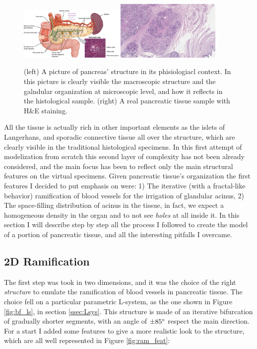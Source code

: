 \documentclass[12pt,a4paper]{report}
\begin{document}
\begin{figure}
    \centering
    \includegraphics[width = 0.45\textwidth]{images/panc_struct}
    \includegraphics[width = 0.45\textwidth]{images/panc_specimen}
    \caption{(left) A picture of pancreas' structure in its phisiologiacl context. In this picture is clearly visible the macroscopic structure and the galndular organization at microscopic level, and how it reflects in the histological sample. (right) A real pancreatic tissue sample with H\&E staining.}
    \label{fig:panc_struct}
\end{figure}

All the tissue is actually rich in other important elements as the islets of Langerhans, and sporadic connective tissue all over the structure, which are clearly visible in the traditional histological specimens. In this first attempt of modelization from scratch this second layer of complexity has not been already considered, and the main focus has been to reflect only the main structural features on the virtual specimens. Given pancreatic tissue's organization the first features I decided to put emphasis on were: 1) The iterative (with a fractal-like behavior) ramification of blood vessels for the irrigation of glandular acinus, 2) The space-filling distribution of acinus in the tissue, in fact, we expect a homogeneous density in the organ and to not see \textit{holes} at all inside it. In this section I will describe step by step all the process I followed to create the model of a portion of pancreatic tissue, and all the interesting pitfalls I overcame.


\subsection{2D Ramification}
    The first step was took in two dimensions, and it was the choice of the right \textit{structure} to emulate the ramification of blood vessels in pancreatic tissue. The choice fell on a particular parametric L-system, as the one shown in Figure \ref{fig:bf_ls}, in section \ref{ssec:Lsys}. This structure is made of an iterative bifurcation of gradually shorter segments, with an angle of $\pm 85 \degree$ respect the main direction. For a start I added some features to give a more realistic look to the structure, which are all well represented in Figure \ref{fig:ram_feat}:
\end{document}
